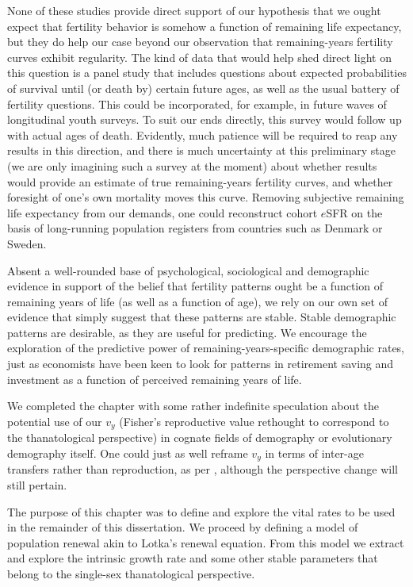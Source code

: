 None of these studies provide
direct support of our hypothesis that we ought expect that fertility behavior is
somehow a function of remaining life expectancy, but they do help our case
beyond our observation that remaining-years fertility curves exhibit regularity. 
The kind of data that would help shed direct light on this question is a
panel study that includes questions about expected probabilities of survival 
until (or death by) certain future ages, as well as the usual battery of fertility 
questions. This could be incorporated, for example, in future waves of
longitudinal youth surveys. To suit our ends directly, this survey would follow
up with actual ages of death. Evidently, much patience will be required to reap
any results in this direction, and there is much uncertainty at this preliminary
stage (we are only imagining such a survey at the moment) about whether results
would provide an estimate of true remaining-years fertility curves, and whether
foresight of one's own mortality moves this curve. Removing subjective
remaining life expectancy from our demands, one could reconstruct cohort $e$SFR
on the basis of long-running population registers from countries such as Denmark or
Sweden.

Absent a well-rounded base of psychological, sociological and demographic
evidence in support of the belief that fertility patterns ought be a function of
remaining years of life (as well as a function of age), we rely on our own
set of evidence that simply suggest that these patterns are stable. Stable
demographic patterns are desirable, as they are useful for predicting. We encourage
the exploration of the predictive power of remaining-years-specific
demographic rates, just as economists have been keen to look for patterns in
retirement saving and investment as a function of perceived remaining years of
life.

We completed the chapter with some rather indefinite speculation about the
potential use of our $v_y$ (Fisher's reproductive value rethought to correspond
to the thanatological perspective) in cognate fields of demography or
evolutionary demography itself. One could just as well reframe $v_y$ in terms of
inter-age transfers rather than reproduction, as per \citet{lee2003rethinking},
although the perspective change will still pertain.

The purpose of this chapter was to define and explore the vital rates to be used
in the remainder of this dissertation. We proceed by defining a model of
population renewal akin to Lotka's renewal equation. From this model we
extract and explore the intrinsic growth rate and some other stable
parameters that belong to the single-sex thanatological perspective. 

\FloatBarrier


